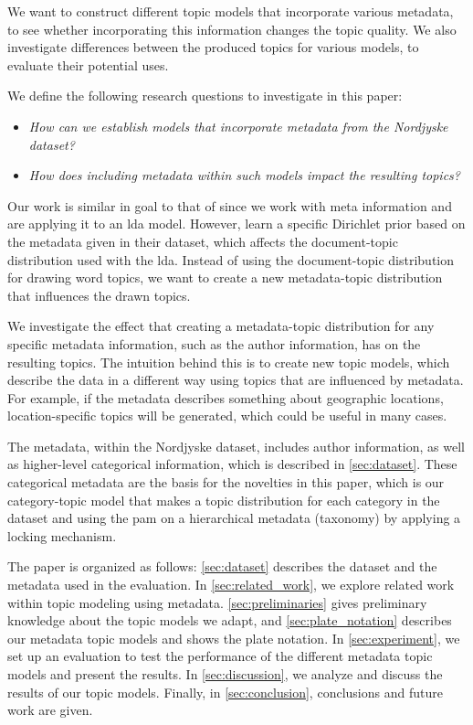 We want to construct different topic models that incorporate various metadata, to see whether incorporating this information changes the topic quality. 
We also investigate differences between the produced topics for various models, to evaluate their potential uses.

We define the following research questions to investigate in this paper:

\begin{itemize}
	\item \textit{How can we establish models that incorporate metadata from the Nordjyske dataset?}
	\item \textit{How does including metadata within such models impact the resulting topics?}
\end{itemize}

Our work is similar in goal to that of \citet{MetaLDA2017} since we work with meta information and are applying it to an \gls{lda} model.
However, \citet{MetaLDA2017} learn a specific Dirichlet prior based on the metadata given in their dataset, which affects the document-topic distribution used with the \gls{lda}.
Instead of using the document-topic distribution for drawing word topics, we want to create a new metadata-topic distribution that influences the drawn topics.

We investigate the effect that creating a metadata-topic distribution for any specific metadata information, such as the author information, has on the resulting topics.
The intuition behind this is to create new topic models, which describe the data in a different way using topics that are influenced by metadata.
For example, if the metadata describes something about geographic locations, location-specific topics will be generated, which could be useful in many cases.

The metadata, within the Nordjyske dataset, includes author information, as well as higher-level categorical information, which is described in \autoref{sec:dataset}.
These categorical metadata are the basis for the novelties in this paper, which is our category-topic model that makes a topic distribution for each category in the dataset and using the \gls{pam} on a hierarchical metadata (taxonomy) by applying a locking mechanism.

The paper is organized as follows:
\autoref{sec:dataset} describes the dataset and the metadata used in the evaluation.
In \autoref{sec:related_work}, we explore related work within topic modeling using metadata.
\autoref{sec:preliminaries} gives preliminary knowledge about the topic models we adapt, and \autoref{sec:plate_notation} describes our metadata topic models and shows the plate notation.
In \autoref{sec:experiment}, we set up an evaluation to test the performance of the different metadata topic models and present the results.
In \autoref{sec:discussion}, we analyze and discuss the results of our topic models.
Finally, in \autoref{sec:conclusion}, conclusions and future work are given.
